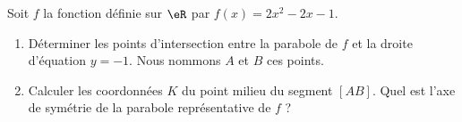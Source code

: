 
\begin{exercice}\label{exosmath-0391}

    Soit $f$ la fonction définie sur \( \eR\) par \( f(x)=2x^2-2x-1\).
    \begin{enumerate}
        \item
            Déterminer les points d'intersection entre la parabole de \( f\) et la droite d'équation \( y=-1\). Nous nommons \( A\) et \( B\) ces points.
        \item
            Calculer les coordonnées \( K\) du point milieu du segment \( [AB]\). Quel est l'axe de symétrie de la parabole représentative de \( f\) ?
    \end{enumerate}

\end{exercice}
